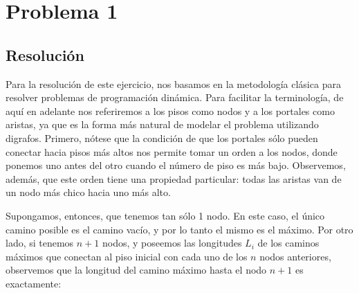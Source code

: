 \documentclass{article}
\theoremstyle{definition}
\theoremstyle{remark}
\begin{document}
{} %

\subtitulo{}
\grupo{}

 
\maketitle

\pagebreak

\tableofcontents

\pagebreak


\section{Problema 1}

\subsection{Resolución}

Para la resolución de este ejercicio, nos basamos en la metodología clásica para resolver problemas de programación dinámica. Para facilitar la terminología, de aquí en adelante nos referiremos a los pisos como nodos y a los portales como aristas, ya que es la forma más natural de modelar el problema utilizando digrafos. Primero, nótese que la condición de que los portales sólo pueden conectar hacia pisos más altos nos permite tomar un orden a los nodos, donde ponemos uno antes del otro cuando el número de piso es más bajo. Observemos, además, que este orden tiene una propiedad particular: todas las aristas van de un nodo más chico hacia uno más alto.


Supongamos, entonces, que tenemos tan sólo 1 nodo. En este caso, el único camino posible es el camino vacío, y por lo tanto el mismo es el máximo. Por otro lado, si tenemos $n + 1$ nodos, y poseemos las longitudes $L_i$ de los caminos máximos que conectan al piso inicial con cada uno de los $n$ nodos anteriores, observemos que la longitud del camino máximo hasta el nodo $n + 1$ es exactamente:
\end{document}
